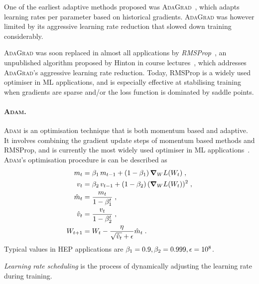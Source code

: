                     One of the earliest adaptive methods proposed was \textsc{AdaGrad}~\cite{duchi_adaptive_nodate}, which adapts learning rates per parameter based on historical gradients.
                    \textsc{AdaGrad} was however limited by its aggressive learning rate reduction that slowed down training considerably.
                    
                    \textsc{AdaGrad} was soon replaced in almost all applications by \emph{RMSProp}~\cite{hinton_neural_nodate}, an unpublished algorithm proposed by Hinton in course lectures~\cite{ruder_overview_2017}, which addresses \textsc{AdaGrad}'s aggressive learning rate reduction.
                    Today, RMSProp is a widely used optimiser in ML applications, and is especially effective at stabilising training when gradients are sparse and/or the loss function is dominated by saddle points.
            
            \paragraph{\textsc{Adam}.}
            
                \textsc{Adam} is an optimisation technique that is both momentum based and adaptive.
                It involves combining the gradient update steps of momentum based methods and RMSProp, and is currently the most widely used optimiser in ML applications~\cite{kingma_adam_2017}.
                \textsc{Adam}'s optimisation procedure is can be described as
                 \begin{align}
                     m_t &= \beta_1\, m_{t-1} + (1 - \beta_1) \,\grad_W L(W_t)\;, \\
                     v_t &= \beta_2 \,v_{t-1} + (1 - \beta_2) \,(\grad_W L(W_t))^2\;, \\
                     \hat{m}_t &= \frac{m_t}{1 - \beta_1^t}\;, \\
                     \hat{v}_t &= \frac{v_t}{1 - \beta_2^t}\;, \\
                     W_{t+1} &= W_t - \frac{\eta}{\sqrt{\hat{v}_t} + \epsilon} \hat{m}_t\;.
                 \end{align}
                Typical values in HEP applications are \(\beta_1 = 0.9, \beta_2 = 0.999, \epsilon = \num{d8}\).

            \begin{definition}

                \emph{Learning rate scheduling} is the process of dynamically adjusting the learning rate during training.
            \end{definition}
                
